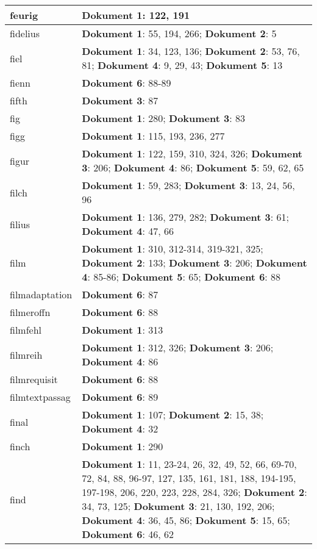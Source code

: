 \documentclass[a5paper]{article}
\begin{document}
\begin{longtable}[l]{|l|p{3in}|}
\hline
feurig & \textbf{Dokument 1}: 122, 191 \\
\hline
fidelius & \textbf{Dokument 1}: 55, 194, 266; \textbf{Dokument 2}: 5 \\
\hline
fiel & \textbf{Dokument 1}: 34, 123, 136; \textbf{Dokument 2}: 53, 76, 81; \textbf{Dokument 4}: 9, 29, 43; \textbf{Dokument 5}: 13 \\
\hline
fienn & \textbf{Dokument 6}: 88-89 \\
\hline
fifth & \textbf{Dokument 3}: 87 \\
\hline
fig & \textbf{Dokument 1}: 280; \textbf{Dokument 3}: 83 \\
\hline
figg & \textbf{Dokument 1}: 115, 193, 236, 277 \\
\hline
figur & \textbf{Dokument 1}: 122, 159, 310, 324, 326; \textbf{Dokument 3}: 206; \textbf{Dokument 4}: 86; \textbf{Dokument 5}: 59, 62, 65 \\
\hline
filch & \textbf{Dokument 1}: 59, 283; \textbf{Dokument 3}: 13, 24, 56, 96 \\
\hline
filius & \textbf{Dokument 1}: 136, 279, 282; \textbf{Dokument 3}: 61; \textbf{Dokument 4}: 47, 66 \\
\hline
film & \textbf{Dokument 1}: 310, 312-314, 319-321, 325; \textbf{Dokument 2}: 133; \textbf{Dokument 3}: 206; \textbf{Dokument 4}: 85-86; \textbf{Dokument 5}: 65; \textbf{Dokument 6}: 88 \\
\hline
filmadaptation & \textbf{Dokument 6}: 87 \\
\hline
filmeroffn & \textbf{Dokument 6}: 88 \\
\hline
filmfehl & \textbf{Dokument 1}: 313 \\
\hline
filmreih & \textbf{Dokument 1}: 312, 326; \textbf{Dokument 3}: 206; \textbf{Dokument 4}: 86 \\
\hline
filmrequisit & \textbf{Dokument 6}: 88 \\
\hline
filmtextpassag & \textbf{Dokument 6}: 89 \\
\hline
final & \textbf{Dokument 1}: 107; \textbf{Dokument 2}: 15, 38; \textbf{Dokument 4}: 32 \\
\hline
finch & \textbf{Dokument 1}: 290 \\
\hline
find & \textbf{Dokument 1}: 11, 23-24, 26, 32, 49, 52, 66, 69-70, 72, 84, 88, 96-97, 127, 135, 161, 181, 188, 194-195, 197-198, 206, 220, 223, 228, 284, 326; \textbf{Dokument 2}: 34, 73, 125; \textbf{Dokument 3}: 21, 130, 192, 206; \textbf{Dokument 4}: 36, 45, 86; \textbf{Dokument 5}: 15, 65; \textbf{Dokument 6}: 46, 62 \\

\end{longtable}
\end{document}

